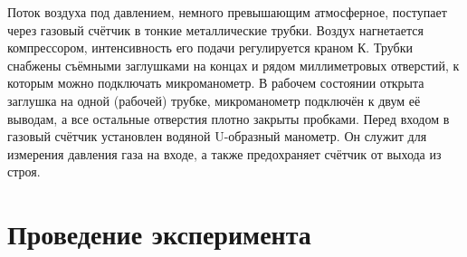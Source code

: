 \documentclass[14pt, a4paper]{report}
\begin{document}
Поток воздуха под давлением, немного превышающим атмосферное, поступает через газовый счётчик в тонкие металлические трубки. Воздух нагнетается компрессором, интенсивность его подачи регулируется краном К. Трубки снабжены съёмными заглушками на концах и рядом миллиметровых отверстий, к которым можно подключать микроманометр. В рабочем состоянии открыта заглушка на одной (рабочей) трубке, микроманометр подключён к двум её выводам, а все остальные отверстия плотно закрыты пробками. Перед входом в газовый счётчик установлен водяной U-образный манометр. Он служит для измерения давления газа на входе, а также предохраняет счётчик от выхода из строя. 

\section{Проведение эксперимента}
\end{document}
